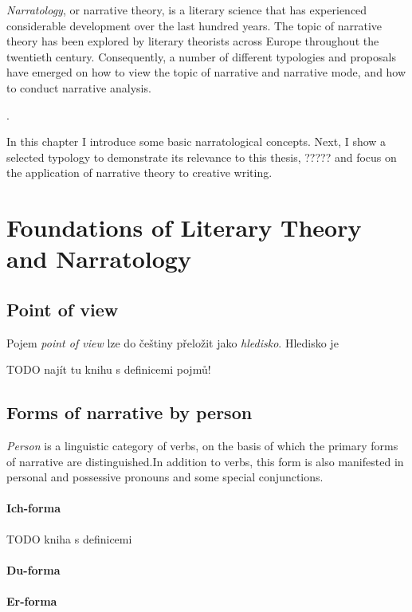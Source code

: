 \emph{Narratology}, or narrative theory, is a literary science that has experienced considerable development over the last hundred years. The topic of narrative theory has been explored by literary theorists across Europe throughout the twentieth century. Consequently, a number of different typologies and proposals have emerged on how to view the topic of narrative and narrative mode, and how to conduct narrative analysis.

.\cite{kubicek-vypravec}

In this chapter I introduce some basic narratological concepts. Next, I show a selected typology to demonstrate its relevance to this thesis, ????? and focus on the application of narrative theory to creative writing.

\section{Foundations of Literary Theory and Narratology}

\subsection{Point of view}

Pojem \emph{point of view} lze do češtiny přeložit jako \emph{hledisko}. Hledisko je

TODO najít tu knihu s definicemi pojmů!

\subsection{Forms of narrative by person}

\emph{Person} is a linguistic category of verbs, on the basis of which the primary forms of narrative are distinguished.In addition to verbs, this form is also manifested in personal and possessive pronouns and some special conjunctions.
\paragraph{Ich-forma}

TODO kniha s definicemi

\paragraph{Du-forma}

\paragraph{Er-forma}

